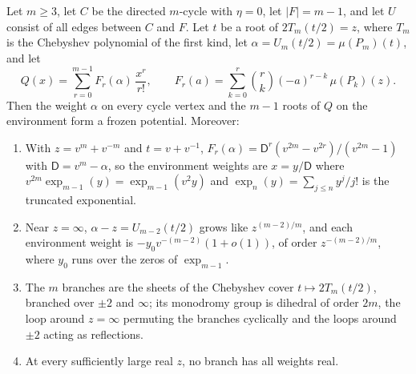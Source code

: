 \documentclass[final]{siamart0516}
\numberwithin{theorem}{section}
\numberwithin{equation}{section}
\theoremstyle{siamnonum}
\theoremstyle{plain}
\begin{document}
\begin{theorem}\label{thm:every-cycle}
Let $m\ge3$, let $C$ be the directed $m$-cycle with $\eta=0$, let $|F|=m-1$, and let $U$ consist of all edges between $C$ and $F$. Let $t$ be a root of $2T_m(t/2)=z$, where $T_m$ is the Chebyshev polynomial of the first kind, let $\alpha=U_m(t/2)=\mu(P_m)(t)$, and let
\[
Q(x)=\sum_{r=0}^{m-1}F_r(\alpha)\,\frac{x^{r}}{r!},\qquad F_r(a)=\sum_{k=0}^{r}\binom{r}{k}(-a)^{r-k}\,\mu(P_k)(z).
\]
Then the weight $\alpha$ on every cycle vertex and the $m-1$ roots of $Q$ on the environment form a frozen potential. Moreover:
\begin{enumerate}[label=\textup{(\arabic*)}]
\item With $z=v^{m}+v^{-m}$ and $t=v+v^{-1}$, $F_r(\alpha)=\mathsf D^{r}(v^{2m}-v^{2r})/(v^{2m}-1)$ with $\mathsf D=v^{m}-\alpha$, so the environment weights are $x=y/\mathsf D$ where $v^{2m}\exp_{m-1}(y)=\exp_{m-1}(v^{2}y)$ and $\exp_n(y)=\sum_{j\le n}y^{j}/j!$ is the truncated exponential.
\item Near $z=\infty$, $\alpha-z=U_{m-2}(t/2)$ grows like $z^{(m-2)/m}$, and each environment weight is $-y_0v^{-(m-2)}(1+o(1))$, of order $z^{-(m-2)/m}$, where $y_0$ runs over the zeros of $\exp_{m-1}$.
\item The $m$ branches are the sheets of the Chebyshev cover $t\mapsto2T_m(t/2)$, branched over $\pm2$ and $\infty$; its monodromy group is dihedral of order $2m$, the loop around $z=\infty$ permuting the branches cyclically and the loops around $\pm2$ acting as reflections.
\item At every sufficiently large real $z$, no branch has all weights real.
\end{enumerate}
\end{theorem}
\end{document}
